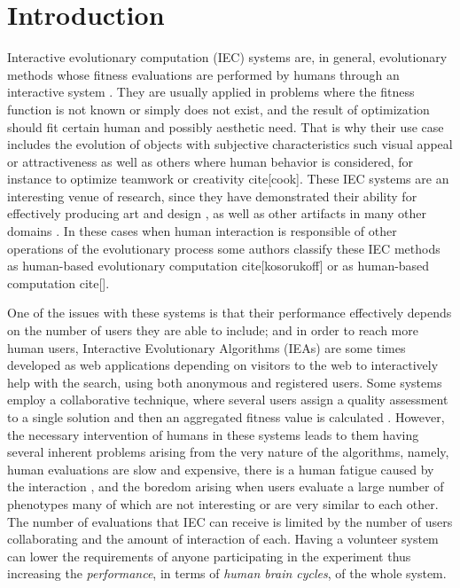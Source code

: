 \section{Introduction}




Interactive evolutionary computation (IEC) systems are, in general, evolutionary methods
whose fitness evaluations are performed by humans through an
interactive system \cite{eiben2015interactive}. They are usually
applied in problems where the fitness function is not known  or simply
does not exist, and the result
of optimization should fit certain human and possibly aesthetic
need. That is why their use case includes the evolution of objects
with subjective characteristics such visual appeal or 
attractiveness \cite{biomorphs} as well as others where human behavior is 
considered, for instance to optimize teamwork \cite{kosorukoff2002evolutionary}
or creativity cite[cook].
These IEC systems are an interesting venue of research, since they have demonstrated their ability for effectively 
producing art and design \cite{Bentley:1999:intro,Sims:1991,todd:1992,evoeco},
as well as other artifacts in many other domains \cite{ie1}. In these cases when human interaction is responsible of other 
operations of the evolutionary process some authors classify these IEC methods 
as human-based evolutionary computation cite[kosorukoff] or as human-based computation cite[].

One of the issues with these systems is that their performance effectively depends on the number of users
they are able to include; and in order to reach more human users,
Interactive Evolutionary Algorithms (IEAs) are 
some times developed as web applications depending on visitors to the web to interactively help
with the search, using both anonymous and registered users. Some systems 
employ a collaborative technique, where several users assign a quality assessment 
to a single solution and then an aggregated fitness value is calculated 
\cite{picbreeder,seyama2016development,wagy2014collective}.
However, the necessary intervention of humans in these systems leads
to them having several inherent problems arising from the very nature of 
the algorithms, namely, human evaluations are slow and expensive, there is a
human fatigue caused by the interaction \cite{ie1}, and
the boredom arising when users evaluate a large number of phenotypes 
many of which are not interesting or are very similar to each other. 
The number of evaluations that IEC can receive is limited by the number of users
collaborating and the amount of interaction of each. Having a volunteer system 
can lower the requirements of anyone participating in
the experiment thus increasing the {\em performance}, in terms of {\em
human brain cycles}, of the whole system.

